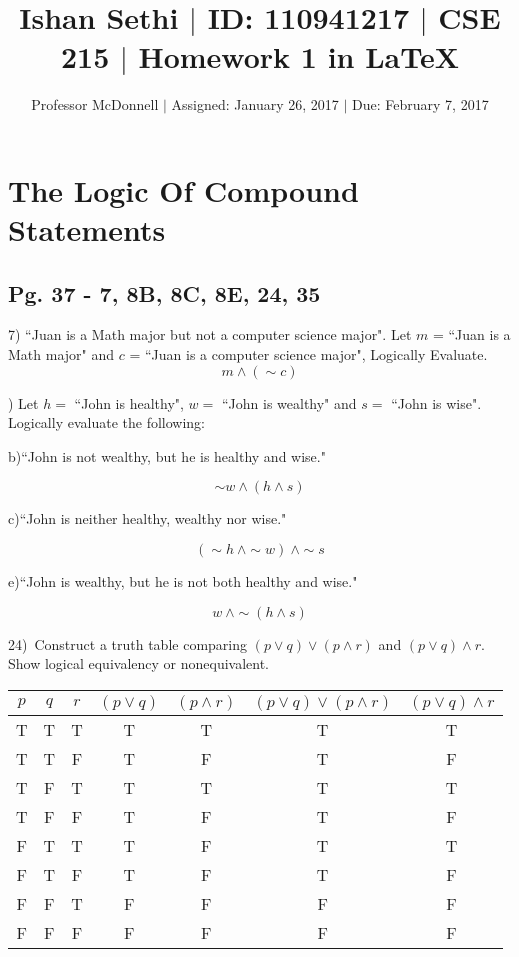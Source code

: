 \documentclass[11pt]{article}
\begin{document}
\title{\vspace{-.5in} Ishan Sethi $|$ ID: 110941217 $|$ CSE 215 $|$ Homework 1 in \LaTeX}
\author{Professor McDonnell $|$ Assigned: January 26, 2017 $|$ Due: February 7, 2017}
\date{}
\maketitle
\hrulefill
\tableofcontents

\section{The Logic Of Compound Statements}
	\subsection{Pg. 37 - 7, 8B, 8C, 8E, 24, 35}
	\begin{flushleft}

	7) ``Juan is a Math major but not a computer science major". Let $m$ = ``Juan is a Math major" and $c$ = ``Juan is a computer science major", Logically Evaluate.
	$$m \land (\sim c)$$
	
	) Let $h =$ ``John is healthy", $w =$ ``John is wealthy" and $s =$ ``John is wise". Logically evaluate the following:
	
	b)``John is not wealthy, but he is healthy and wise."
	
	$$\sim w \land (h \land s)$$
	
	c)``John is neither healthy, wealthy nor wise."
	
	$$(\sim h \  \land \sim w)\ \land \sim s$$
	
	e)``John is wealthy, but he is not both healthy and wise."
	
	$$w \ \land \sim (h \land s)$$
	
	\hrulefill
	
	24)\ Construct a truth table comparing $(p \lor q) \lor (p \land r)$ and $(p \lor q) \land r$. Show logical equivalency or nonequivalent.
	
	\end{flushleft}

	\begin{center}	%
	\begin{tabular}{|c|c|c|c|c|c|c|}\hline
	$p$ & $q$ & $r$ & $(p \lor q)$ & $(p \land r)$ & $(p \lor q) \lor (p \land r)$ & $(p \lor q) \land r$ \\ \hline
	T & T & T & T & T & T & T \\ \hline
	T & T & F & T & F & T & F \\ \hline
	T & F & T & T & T & T & T \\ \hline
	T & F & F & T & F & T & F \\ \hline
	F & T & T & T & F & T & T \\ \hline
	F & T & F & T & F & T & F \\ \hline
	F & F & T & F & F & F & F \\ \hline
	F & F & F & F & F & F & F \\ \hline
	\end{tabular}
	\end{center} %
	
\end{document}
